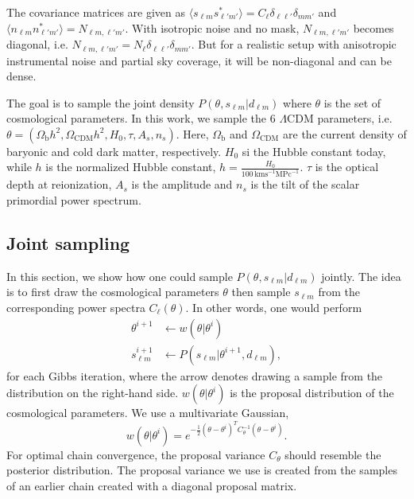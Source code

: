\documentclass[twocolumn]{../common/aa}
\begin{document}
The covariance matrices are given as $\langle s_{\ell m}s_{\ell' m'}^* \rangle = C_{\ell} \delta_{\ell \ell'}\delta_{mm'}$ and $\langle n_{\ell m}n_{\ell' m'}^* \rangle = N_{\ell m, \ell' m'}$. With isotropic noise and no mask, $N_{\ell m, \ell' m'} $ becomes diagonal, i.e. $N_{\ell m, \ell' m'} = N_\ell \delta_{\ell \ell'}\delta_{mm'}$. But for a realistic setup with anisotropic instrumental noise and partial sky coverage, it will be non-diagonal and can be dense.

The goal is to sample the joint density $P(\theta, s_{\ell m} | d_{\ell m})$ where $\theta$ is the set of cosmological parameters. In this work, we sample the 6 $\Lambda$CDM parameters, i.e. $\theta=(\Omega_{\textrm{b}}h^2, \Omega_{\textrm{CDM}}h^2, H_0, \tau, A_s, n_s)$. Here, $\Omega_\mathrm{b}$ and $\Omega_\mathrm{CDM}$ are the current density of baryonic and cold dark matter, respectively. $H_0$ si the Hubble constant today, while $h$ is the normalized Hubble constant, $h=\frac{H_0}{100\,\mathrm{km s}^{-1} \mathrm{MPc}^{-1}}$. $\tau$ is the optical depth at reionization, $A_s$ is the amplitude and $n_s$ is the tilt of the scalar primordial power spectrum.

\subsection{Joint sampling}

In this section, we show how one could sample $P(\theta, s_{\ell m} | d_{\ell m})$ jointly. The idea is to first draw the cosmological parameters $\theta$ then sample $s_{\ell m}$ from the corresponding power spectra $C_{\ell}(\theta)$. In other words, one would perform
\begin{align}
    \theta^{i+1} 
 &\leftarrow w(\theta |\theta^i)\\
    s_{\ell m}^{i+1} &\leftarrow P(s_{\ell m} | \theta^{i+1}, d_{\ell m}),
\end{align}
for each Gibbs iteration, where the arrow denotes drawing a sample from the distribution on the right-hand side. $w(\theta |\theta^i)$ is the proposal distribution of the cosmological parameters. We use a multivariate Gaussian,
\begin{equation}
w(\theta |\theta^i) = e^{-\frac12 \left(\theta - \theta^i \right)^T C_{\theta}^{-1}\left(\theta - \theta^i \right)}.
\end{equation}
For optimal chain convergence, the proposal variance $C_{\theta}$ should resemble the posterior distribution. The proposal variance we use is created from the samples of an earlier chain created with a diagonal proposal matrix.
\end{document}
